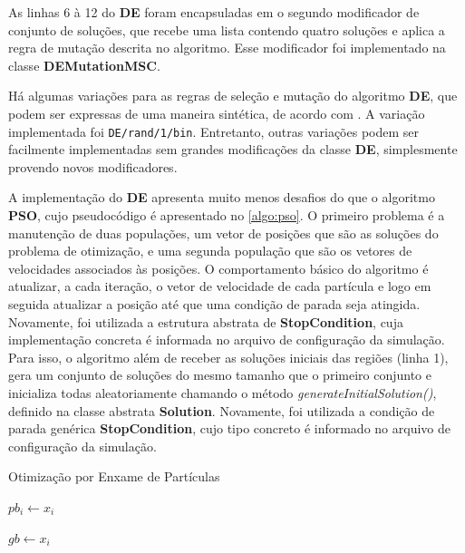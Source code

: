 As linhas 6 à 12 do \textbf{DE} foram encapsuladas em o segundo modificador de conjunto de soluções, que recebe uma lista contendo quatro soluções e aplica a regra de mutação descrita no algoritmo. Esse modificador foi implementado na classe  \textbf{DEMutationMSC}. 

Há algumas variações para as regras de seleção e mutação do algoritmo \textbf{DE}, que podem ser expressas de uma maneira sintética, de acordo com . A variação implementada foi \texttt{DE/rand/1/bin}. Entretanto, outras variações podem ser facilmente implementadas sem grandes modificações da classe \textbf{DE}, simplesmente provendo novos modificadores.

A implementação do \textbf{DE} apresenta muito menos desafios do que o algoritmo \textbf{PSO}, cujo pseudocódigo é apresentado no \autoref{algo:pso}. O primeiro problema é a manutenção de duas populações, um vetor de posições que são as soluções do problema de otimização, e uma segunda população que são os vetores de velocidades associados às posições. O comportamento básico do algoritmo é atualizar, a cada iteração, o vetor de velocidade de cada partícula e logo em seguida atualizar a posição até que uma condição de parada seja atingida. Novamente, foi utilizada a estrutura abstrata de \textbf{StopCondition}, cuja implementação concreta é informada no arquivo de configuração da simulação. Para isso, o algoritmo além de receber as soluções iniciais das regiões (linha 1), gera um conjunto de soluções do mesmo tamanho que o primeiro conjunto e inicializa todas aleatoriamente chamando o método \textit{generateInitialSolution()}, definido na classe abstrata \textbf{Solution}. Novamente, foi utilizada a condição de parada genérica \textbf{StopCondition}, cujo tipo concreto é informado no arquivo de configuração da simulação. 

\begin{algorithm}[H]
\caption{Otimização por Enxame de Partículas}
\label{algo:pso}
\begin{algorithmic}[1]
    \State {} 
    \State {}
    
                \State $pb_i \gets x_i$ 
            \EndIf
            
                \State $gb \gets x_i$
            \EndIf
        \EndFor
    
            \EndFor
        \EndFor
    \EndWhile
\end{algorithmic}
\end{algorithm}

